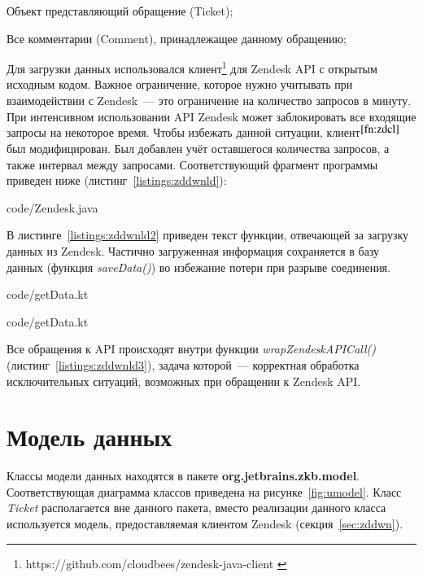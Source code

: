 \begin{enumerate*}
\item Объект представляющий обращение (Ticket);
\item Все комментарии (Comment), принадлежащее данному обращению;
\end{enumerate*}

Для загрузки данных использовался клиент\footnote{https://github.com/cloudbees/zendesk-java-client \label{fn:zdcl}} для Zendesk API с открытым исходным кодом. Важное ограничение, которое нужно учитывать при взаимодействии с Zendesk~--- это ограничение на количество запросов в минуту. При интенсивном использовании API Zendesk может заблокировать все входящие запросы на некоторое время. Чтобы избежать данной ситуации, клиент$^{\ref{fn:zdcl}}$ был модифицирован. Был добавлен учёт оставшегося количества запросов, а также интервал между запросами. Соответствующий фрагмент программы приведен ниже (листинг~\ref{listings:zddwnld}):


{code/Zendesk.java}

В листинге~\ref{listings:zddwnld2} приведен текст функции, отвечающей за загрузку данных из Zendesk. Частично загруженная информация сохраняется в базу данных (функция \textit{saveData()}) во избежание потери при разрыве соединения.


{code/getData.kt}


{code/getData.kt}

Все обращения к API происходят внутри функции \textit{wrapZendeskAPICall()} (листинг~\ref{listings:zddwnld3}), задача которой~--- корректная обработка исключительных ситуаций, возможных при обращении к Zendesk API.

\section{Модель данных}

Классы модели данных находятся в пакете \textbf{org.jetbrains.zkb.model}. Соответствующая диаграмма классов приведена на рисунке~\ref{fig:umodel}. Класс \textit{Ticket} располагается вне данного пакета, вместо реализации данного класса используется модель, предоставляемая клиентом Zendesk (секция~\ref{sec:zddwn}).

